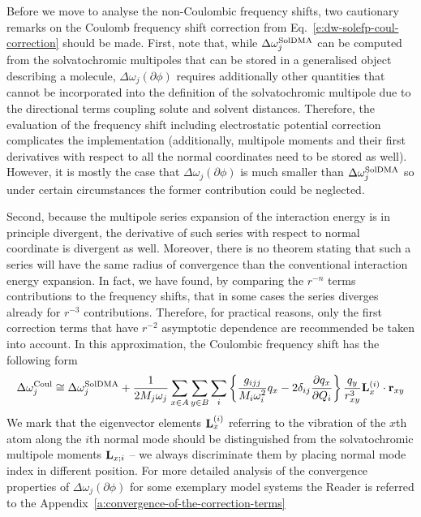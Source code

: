 \documentclass[a4paper,titlepage,twoside,fleqn,12pt]{book}
\newcommand{\fderiv}[2]{\ensuremath{
    \frac{\partial #1}{\partial #2}}}
\begin{document}
\begin{refsection}
Before we move to analyse the non\hyp{}Coulombic frequency shifts, two cautionary remarks
on the Coulomb frequency shift correction from Eq.~\eqref{e:dw-solefp-coul-correction} should be made.
First, note that, while $\Delta \omega_j^{\rm SolDMA}$ can be computed from the
solvatochromic multipoles that can be stored in a generalised object
describing a molecule, $\Delta\omega_j({\partial\phi})$ requires 
additionally other quantities that cannot be incorporated
into the definition of the solvatochromic multipole due to the directional
terms coupling solute and solvent distances. Therefore,
the evaluation of the frequency shift including electrostatic potential
correction complicates the implementation (additionally, multipole moments
and their first derivatives with respect to all the normal coordinates need 
to be stored as well). However, it is mostly the case
that $\Delta\omega_j({\partial\phi})$ is much smaller than $\Delta \omega_j^{\rm SolDMA}$
so under certain circumstances the former contribution could be
neglected.

Second, because the multipole series expansion of the interaction energy
is in principle divergent, the derivative of such series
with respect to normal coordinate is divergent as well. Moreover, 
there is no theorem stating that such a series will have the same radius of convergence
than the conventional interaction energy expansion. In fact,
we have found, by comparing the $r^{-n}$ terms contributions to the frequency
shifts, that in some cases the series diverges already for 
$r^{-3}$ contributions. Therefore, for practical reasons, only
the first correction terms that have $r^{-2}$ asymptotic dependence
are recommended be taken into account. In this approximation,
the Coulombic frequency shift has the following form
%
\begin{equation} \label{e:dw-solefp-coul-working}
\Delta\omega_j^{\rm Coul} \cong \Delta\omega_j^{\rm SolDMA} + \frac{1}{2M_j\omega_j}
\sum_{x \in A}\sum_{y \in B} \sum_i \left\{ 
\frac{g_{ijj}}{M_i\omega_i^2} q_x 
- 2\delta_{ij} \fderiv{q_x}{Q_i} \right\} \frac{q_y}{r_{xy}^3} {\bf L}_x^{(i)} \cdot {\bf r}_{xy} 
\end{equation}
%
We mark that the eigenvector elements ${\bf L}_x^{(i)}$
referring to the vibration of the $x$th atom along the $i$th normal mode
should be distinguished from the solvatochromic multipole 
moments ${\bf L}_{x;i}$ -- we always discriminate them by placing
normal mode index in different position.
For more detailed analysis of the convergence properties
of $\Delta\omega_j({\partial\phi})$ for some exemplary model 
systems the Reader is referred to
the Appendix~\ref{a:convergence-of-the-correction-terms}



\end{refsection}
\end{document}
